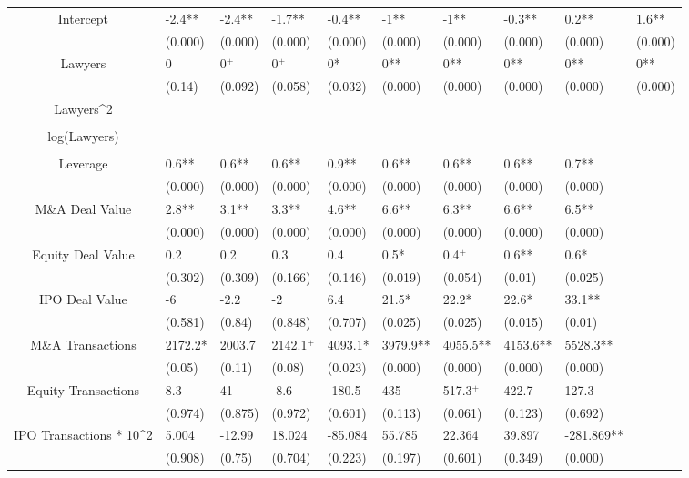 \documentclass{article}
\begin{document}
\begin{table}[H]
\begin{tabular}{|clllllllll|}
Intercept & -2.4** & -2.4** & -1.7** & -0.4** & -1** & -1** & -0.3** & 0.2** & 1.6** \\ 
   & (0.000) & (0.000) & (0.000) & (0.000) & (0.000) & (0.000) & (0.000) & (0.000) & (0.000) \\ 
  Lawyers & 0 & 0$^{+}$ & 0$^{+}$ & 0* & 0** & 0** & 0** & 0** & 0** \\ 
   & (0.14) & (0.092) & (0.058) & (0.032) & (0.000) & (0.000) & (0.000) & (0.000) & (0.000) \\ 
  Lawyers^2 &  &  &  &  &  &  &  &  &  \\ 
   &  &  &  &  &  &  &  &  &  \\ 
  log(Lawyers) &  &  &  &  &  &  &  &  &  \\ 
   &  &  &  &  &  &  &  &  &  \\ 
  Leverage & 0.6** & 0.6** & 0.6** & 0.9** & 0.6** & 0.6** & 0.6** & 0.7** &  \\ 
   & (0.000) & (0.000) & (0.000) & (0.000) & (0.000) & (0.000) & (0.000) & (0.000) &  \\ 
  M\&A Deal Value & 2.8** & 3.1** & 3.3** & 4.6** & 6.6** & 6.3** & 6.6** & 6.5** &  \\ 
   & (0.000) & (0.000) & (0.000) & (0.000) & (0.000) & (0.000) & (0.000) & (0.000) &  \\ 
  Equity Deal Value & 0.2 & 0.2 & 0.3 & 0.4 & 0.5* & 0.4$^{+}$ & 0.6** & 0.6* &  \\ 
   & (0.302) & (0.309) & (0.166) & (0.146) & (0.019) & (0.054) & (0.01) & (0.025) &  \\ 
  IPO Deal Value & -6 & -2.2 & -2 & 6.4 & 21.5* & 22.2* & 22.6* & 33.1** &  \\ 
   & (0.581) & (0.84) & (0.848) & (0.707) & (0.025) & (0.025) & (0.015) & (0.01) &  \\ 
  M\&A Transactions & 2172.2* & 2003.7 & 2142.1$^{+}$ & 4093.1* & 3979.9** & 4055.5** & 4153.6** & 5528.3** &  \\ 
   & (0.05) & (0.11) & (0.08) & (0.023) & (0.000) & (0.000) & (0.000) & (0.000) &  \\ 
  Equity Transactions & 8.3 & 41 & -8.6 & -180.5 & 435 & 517.3$^{+}$ & 422.7 & 127.3 &  \\ 
   & (0.974) & (0.875) & (0.972) & (0.601) & (0.113) & (0.061) & (0.123) & (0.692) &  \\ 
  IPO Transactions * 10^2 & 5.004 & -12.99 & 18.024 & -85.084 & 55.785 & 22.364 & 39.897 & -281.869** &  \\ 
   & (0.908) & (0.75) & (0.704) & (0.223) & (0.197) & (0.601) & (0.349) & (0.000) &  \\ 

\end{tabular}
\end{table}
\end{document}
